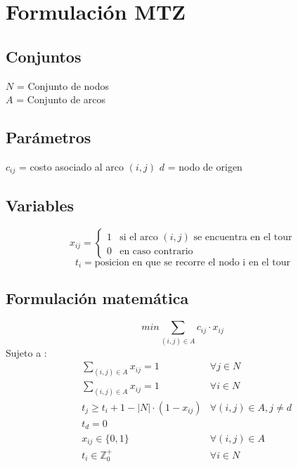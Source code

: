 \documentclass{article}
\numberwithin{equation}{section}
\begin{document}
\newpage
\section{Formulación MTZ}
\subsection{Conjuntos}
$N$ = Conjunto de nodos\\
$A$ = Conjunto de arcos
\subsection{Parámetros}
$c_{ij}$ = costo asociado al arco $(i,j)$
$d$ = nodo de origen
\subsection{Variables}
\begin{flushleft}
\[x_{ij}={\begin{cases}1&{\mbox{si el arco $(i,j)$ se encuentra en el tour}}\\0&{\mbox{en caso contrario}}\end{cases}}
\]
\[t_{i} = \mbox{posicion en que se recorre el nodo i en el tour}\]
\end{flushleft}
\subsection{Formulación matemática}
\begin{equation}
min \sum_{(i,j) \in A} c_{ij} \cdot x_{ij}
\end{equation}
Sujeto a : \begin{align}
& \sum_{(i,j) \in A} x_{ij} = 1 &\forall j \in N \\
& \sum_{(i,j) \in A} x_{ij} = 1 &\forall i \in N \\
& t_{j} \geq t_{i} + 1 - |N| \cdot (1 - x_{ij}) & \forall (i,j) \in A, j \neq d\\
& t_{d} = 0\\
& x_{ij} \in \{0,1\} &\forall (i,j) \in A\\
& t_{i} \in \mathbb{Z}^{+}_{0} &\forall i \in N
\end{align}
\end{document}
